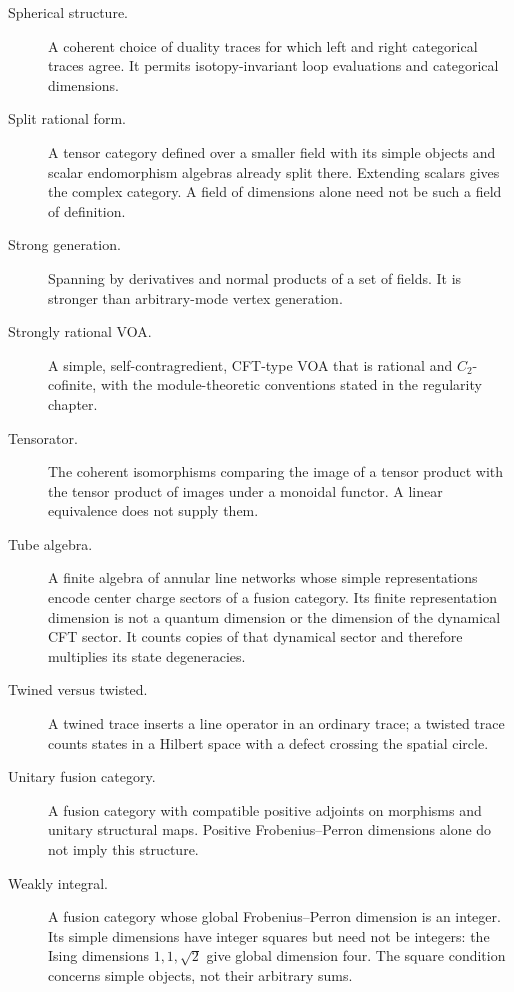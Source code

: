 \begin{description}
\item[Spherical structure.]A coherent choice of duality traces
for which left and right categorical traces agree. It permits
isotopy-invariant loop evaluations and categorical dimensions.

\item[Split rational form.]A tensor category defined over a
smaller field with its simple objects and scalar endomorphism
algebras already split there. Extending scalars gives the complex
category. A field of dimensions alone need not be such a field
of definition.

\item[Strong generation.]Spanning by derivatives and normal
products of a set of fields. It is stronger than arbitrary-mode
vertex generation.

\item[Strongly rational VOA.]A simple, self-contragredient,
CFT-type VOA that is rational and $C_2$-cofinite, with the
module-theoretic conventions stated in the regularity chapter.

\item[Tensorator.]The coherent isomorphisms comparing the image
of a tensor product with the tensor product of images under
a monoidal functor. A linear equivalence does not supply them.

\item[Tube algebra.]A finite algebra of annular line networks whose
simple representations encode center charge sectors of a fusion
category. Its finite representation dimension is not a quantum
dimension or the dimension of the dynamical CFT sector. It counts
copies of that dynamical sector and therefore multiplies its
state degeneracies.

\item[Twined versus twisted.]A twined trace inserts a line operator
in an ordinary trace; a twisted trace counts states in a Hilbert
space with a defect crossing the spatial circle.

\item[Unitary fusion category.]A fusion category with compatible
positive adjoints on morphisms and unitary structural maps.
Positive Frobenius--Perron dimensions alone do not imply
this structure.

\item[Weakly integral.]A fusion category whose global
Frobenius--Perron dimension is an integer. Its simple dimensions
have integer squares but need not be integers: the Ising
dimensions $1,1,\sqrt2$ give global dimension four.
The square condition concerns simple objects, not their arbitrary sums.


\end{description}
